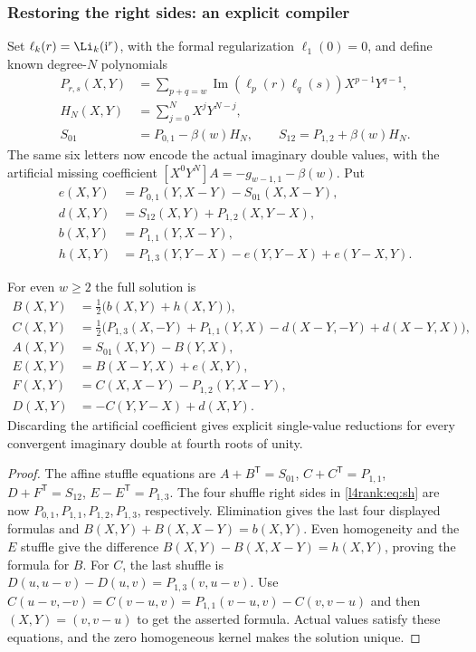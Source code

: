 \subsubsection{Restoring the right sides: an explicit compiler}
\label{l4rank:sec:compiler}
Set $\ell_k(r)=\Li_k(\mathrm i^r)$, with the formal regularization
$\ell_1(0)=0$, and define known degree-$N$ polynomials
\begin{align*}
 P_{r,s}(X,Y)&=\sum_{p+q=w}\operatorname{Im}(\ell_p(r)\ell_q(s))
                    X^{p-1}Y^{q-1},\\
 H_N(X,Y)&=\sum_{j=0}^{N}X^jY^{N-j},\\
 S_{01}&=P_{0,1}-\beta(w)H_N,\qquad
 S_{12}=P_{1,2}+\beta(w)H_N.
\end{align*}
The same six letters now encode the actual imaginary double values,
with the artificial missing coefficient $[X^0Y^N]A=-g_{w-1,1}-\beta(w)$.
Put
\begin{align*}
 e(X,Y)&=P_{0,1}(Y,X-Y)-S_{01}(X,X-Y),\\
 d(X,Y)&=S_{12}(X,Y)+P_{1,2}(X,Y-X),\\
 b(X,Y)&=P_{1,1}(Y,X-Y),\\
 h(X,Y)&=P_{1,3}(Y,Y-X)-e(Y,Y-X)+e(Y-X,Y).
\end{align*}

\begin{theorem}\label{l4rank:thm:compiler}
For even $w\ge2$ the full solution is
\begin{align*}
 B(X,Y)&=\tfrac12\bigl(b(X,Y)+h(X,Y)\bigr),\\
 C(X,Y)&=\tfrac12\bigl(P_{1,3}(X,-Y)+P_{1,1}(Y,X)
                    -d(X-Y,-Y)+d(X-Y,X)\bigr),\\
 A(X,Y)&=S_{01}(X,Y)-B(Y,X),\\
 E(X,Y)&=B(X-Y,X)+e(X,Y),\\
 F(X,Y)&=C(X,X-Y)-P_{1,2}(Y,X-Y),\\
 D(X,Y)&=-C(Y,Y-X)+d(X,Y).
\end{align*}
Discarding the artificial coefficient gives explicit single-value reductions
for every convergent imaginary double at fourth roots of unity.
\end{theorem}
\begin{proof}
The affine stuffle equations are
$A+B^{\mathsf T}=S_{01}$, $C+C^{\mathsf T}=P_{1,1}$,
$D+F^{\mathsf T}=S_{12}$, $E-E^{\mathsf T}=P_{1,3}$.
The four shuffle right sides in \eqref{l4rank:eq:sh} are now
$P_{0,1},P_{1,1},P_{1,2},P_{1,3}$, respectively.
Elimination gives the last four displayed formulas and
$B(X,Y)+B(X,X-Y)=b(X,Y)$.
Even homogeneity and the $E$ stuffle give the difference
$B(X,Y)-B(X,X-Y)=h(X,Y)$, proving the formula for $B$.
For $C$, the last shuffle is
$D(u,u-v)-D(u,v)=P_{1,3}(v,u-v)$.
Use
$C(u-v,-v)=C(v-u,v)=P_{1,1}(v-u,v)-C(v,v-u)$
and then $(X,Y)=(v,v-u)$ to get the asserted formula.
Actual values satisfy these equations, and the zero homogeneous kernel
makes the solution unique.
\end{proof}

